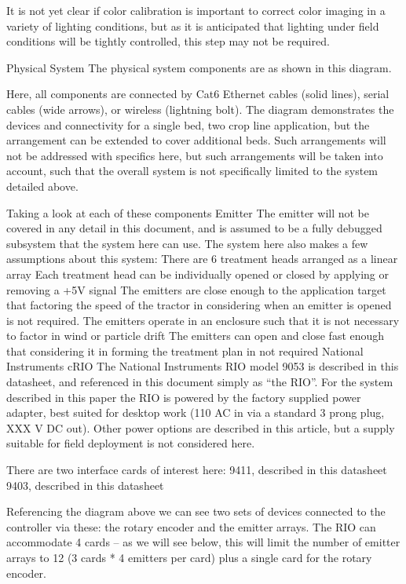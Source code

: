 \documentclass[letterpaper]{article}
\begin{document}
It is not yet clear if color calibration is important to correct color imaging in a variety of lighting conditions, but as it is anticipated that lighting under field conditions will be tightly controlled, this step may not be required.

Physical System
The physical system components are as shown in this diagram.



Here, all components are connected by Cat6 Ethernet cables (solid lines), serial cables (wide arrows), or wireless (lightning bolt). The diagram demonstrates the devices and connectivity for a single bed, two crop line application, but the arrangement can be extended to cover additional beds. Such arrangements will not be addressed with specifics here, but such arrangements will be taken into account, such that the overall system is not specifically limited to the system detailed above.

Taking a look at each of these components
Emitter
The emitter will not be covered in any detail in this document, and is assumed to be a fully debugged subsystem that the system here can use.  The system here also makes a few assumptions about this system:
There are 6 treatment heads arranged as a linear array
Each treatment head can be individually opened or closed by applying or removing a +5V signal
The emitters are close enough to the application target that factoring the speed of the tractor in considering when an emitter is opened is not required.
The emitters operate in an enclosure such that it is not necessary to factor in wind or particle drift
The emitters can open and close fast enough that considering it in forming the treatment plan in not required
National Instruments cRIO
The National Instruments RIO model 9053 is described in this datasheet, and referenced in this document simply as “the RIO”. For the system described in this paper the RIO is powered by the factory supplied power adapter, best suited for desktop work (110 AC in via a standard 3 prong plug, XXX V DC out). Other power options are described in this article, but a supply suitable for field deployment is not considered here.
 
There are two interface cards of interest here:
9411, described in this datasheet
9403, described in this datasheet

Referencing the diagram above we can see two sets of devices connected to the controller via these: the rotary encoder and the emitter arrays. The RIO can accommodate 4 cards -- as we will see below, this will limit the number of emitter arrays to 12 (3 cards * 4 emitters per card) plus a single card for the rotary encoder.
\end{document}

